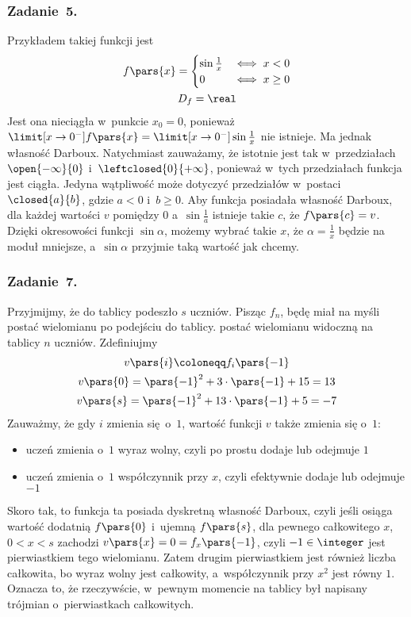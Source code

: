 \subsubsection*{Zadanie~5.}
Przykładem takiej funkcji jest
\begin{gather*}
    f\pars{x} = \begin{cases}
        \sin\frac{1}{x} & \iff x < 0\\
        0 & \iff x \geq 0
    \end{cases}\\
    D_f = \real
\end{gather*}
Jest ona nieciągła w~punkcie \(x_0 = 0\), ponieważ \(\limit[x \to 0^-] f\pars{x} = \limit[x \to 0^-] \sin\frac{1}{x}\) nie istnieje. Ma jednak własność Darboux. Natychmiast zauważamy, że istotnie jest tak w~przedziałach \(\open{-\infty}{0}\) i~\(\leftclosed{0}{+\infty}\), ponieważ w~tych przedziałach funkcja jest ciągła. Jedyna wątpliwość może dotyczyć przedziałów w~postaci \(\closed{a}{b}\), gdzie \(a < 0\) i~\(b \geq 0\). Aby funkcja posiadała własność Darboux, dla każdej wartości \(v\) pomiędzy \(0\) a~\(\sin\frac{1}{a}\) istnieje takie \(c\), że \(f\pars{c} = v\). Dzięki okresowości funkcji \(\sin\alpha\), możemy wybrać takie \(x\), że \(\alpha = \frac{1}{x}\) będzie na moduł mniejsze, a~\(\sin\alpha\) przyjmie taką wartość jak chcemy.
\subsubsection*{Zadanie~7.}
Przyjmijmy, że do tablicy podeszło \(s\) uczniów. Pisząc \(f_n\), będę miał na myśli postać wielomianu po podejściu do tablicy. postać wielomianu widoczną na tablicy \(n\) uczniów. Zdefiniujmy
\begin{gather*}
    v\pars{i} \coloneqq f_i\pars{-1}\\
    v\pars{0} = \pars{-1}^2 + 3 \cdot \pars{-1} + 15 = 13\\
    v\pars{s} = \pars{-1}^2 + 13 \cdot \pars{-1} + 5 = -7
\end{gather*}
Zauważmy, że gdy \(i\) zmienia się o~\(1\), wartość funkcji \(v\) także zmienia się o~\(1\):
\begin{itemize}
    \item uczeń zmienia o~\(1\) wyraz wolny, czyli po prostu dodaje lub odejmuje \(1\)
    \item uczeń zmienia o~\(1\) współczynnik przy \(x\), czyli efektywnie dodaje lub odejmuje \(-1\)
\end{itemize}
Skoro tak, to funkcja ta posiada dyskretną własność Darboux, czyli jeśli osiąga wartość dodatnią \(f\pars{0}\) i~ujemną \(f\pars{s}\), dla pewnego całkowitego \(x\), \(0 < x < s\) zachodzi \(v\pars{x} = 0 = f_x\pars{-1}\), czyli \(-1 \in \integer\) jest pierwiastkiem tego wielomianu. Zatem drugim pierwiastkiem jest również liczba całkowita, bo wyraz wolny jest całkowity, a~współczynnik przy \(x^2\) jest równy \(1\). Oznacza to, że rzeczywście, w~pewnym momencie na tablicy był napisany trójmian o~pierwiastkach całkowitych.
